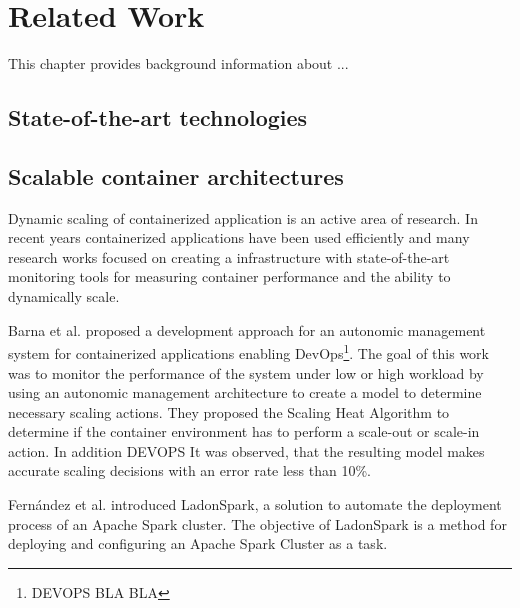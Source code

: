 \chapter{Related Work}
\label{sec:related}
%

This chapter provides background information about ...


\section{State-of-the-art technologies}


\section{Scalable container architectures}
Dynamic scaling of containerized application is an active area of research. In recent years containerized applications have been used efficiently and many research works focused on creating a infrastructure with state-of-the-art monitoring tools for measuring container performance and the ability to dynamically scale. %


Barna et al. \cite{Barna2017ElasticContainerApps} proposed a development approach for an autonomic management system for containerized applications enabling DevOps\footnote{DEVOPS BLA BLA}.
The goal of this work was to monitor the performance of the system under low or high workload by using an autonomic management architecture to create a model to determine necessary scaling actions. They proposed the Scaling Heat Algorithm to determine if the container environment has to perform a scale-out or scale-in action. In addition DEVOPS
It was observed, that the resulting model makes accurate scaling decisions with an error rate less than 10\%.


Fernández et al. \cite{Fernandez2020AutomatedDeploySpark} introduced LadonSpark, a solution to automate the deployment process of an Apache Spark cluster.
The objective of LadonSpark is a method for deploying and configuring an Apache Spark Cluster as a task.


